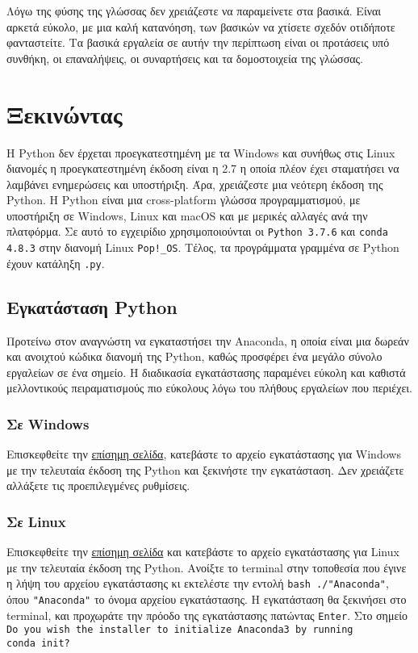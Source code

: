 \documentclass[a4paper,14pt]{extreport}
\begin{document}
Λόγω της φύσης της γλώσσας δεν χρειάζεστε να παραμείνετε στα βασικά. Είναι αρκετά εύκολο, με μια καλή κατανόηση, των βασικών να χτίσετε σχεδόν οτιδήποτε φανταστείτε. Τα βασικά εργαλεία σε αυτήν την περίπτωση είναι οι προτάσεις υπό συνθήκη, οι επαναλήψεις, οι συναρτήσεις και τα δομοστοιχεία της γλώσσας.
\newpage

\section{Ξεκινώντας}

Η Python δεν έρχεται προεγκατεστημένη με τα Windows και συνήθως στις Linux διανομές η προεγκατεστημένη έκδοση είναι η 2.7 η οποία πλέον έχει σταματήσει να λαμβάνει ενημερώσεις και υποστήριξη. Άρα, χρειάζεστε μια νεότερη έκδοση της  Python. Η Python είναι μια cross-platform γλώσσα προγραμματισμού, με υποστήριξη σε Windows, Linux και macOS και με μερικές αλλαγές ανά την πλατφόρμα. Σε αυτό το εγχειρίδιο χρησιμοποιούνται οι \lstinline{Python 3.7.6} και \lstinline{conda 4.8.3} στην διανομή Linux \lstinline{Pop!_OS}. Τέλος, τα προγράμματα γραμμένα σε Python έχουν κατάληξη \lstinline{.py}.

\subsection{Εγκατάσταση Python}

Προτείνω στον αναγνώστη να εγκαταστήσει την Anaconda, η οποία είναι μια δωρεάν και  ανοιχτού κώδικα διανομή της Python, καθώς προσφέρει ένα μεγάλο σύνολο εργαλείων σε ένα σημείο. Η διαδικασία εγκατάστασης παραμένει εύκολη και καθιστά μελλοντικούς πειραματισμούς πιο εύκολους λόγω του πλήθους εργαλείων που περιέχει.

\subsubsection{Σε Windows}

Επισκεφθείτε την \href{https://tinyurl.com/yc39u67t}{επίσημη σελίδα}, κατεβάστε το αρχείο εγκατάστασης για Windows με την τελευταία έκδοση της Python και ξεκινήστε την εγκατάσταση. Δεν χρειάζετε αλλάξετε τις προεπιλεγμένες ρυθμίσεις.

\subsubsection{Σε Linux}

Επισκεφθείτε την \href{https://tinyurl.com/yc39u67t}{επίσημη σελίδα} και κατεβάστε το αρχείο εγκατάστασης για Linux με την τελευταία έκδοση της Python. Ανοίξτε το terminal στην τοποθεσία που έγινε η λήψη του αρχείου εγκατάστασης κι εκτελέστε την εντολή \lstinline{bash ./"Anaconda"}, όπου \lstinline{"Anaconda"} το όνομα αρχείου εγκατάστασης. Η εγκατάσταση θα ξεκινήσει στο terminal, και προχωράτε την πρόοδο της εγκατάστασης πατώντας \lstinline{Enter}. Στο σημείο\\ \lstinline{Do you wish the installer to initialize Anaconda3 by running}\\ \lstinline{conda init?}
\end{document}
